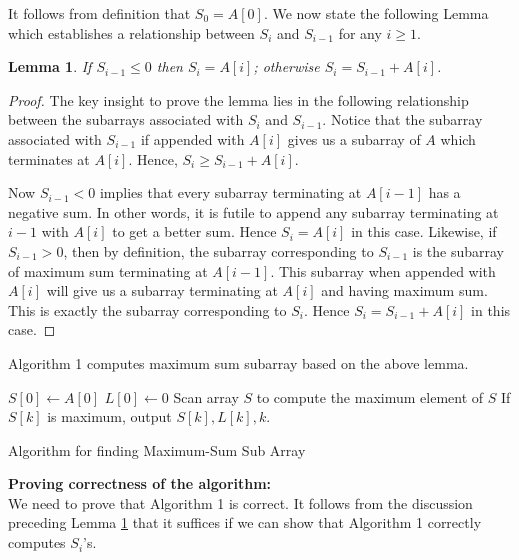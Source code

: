 \documentclass[11pt]{article}
\newtheorem{lemma}[theorem]{Lemma}
\begin{document}
It follows from definition that $S_0=A[0]$. We now state the following 
Lemma which establishes a relationship between $S_i$ and $S_{i-1}$ for any 
$i\ge 1$.
%
\begin{lemma}
If $S_{i-1}\leq 0 $ then $S_i=A[i]$; otherwise $S_i=S_{i-1}+A[i]$.
\label{Lemma:Si}
\end{lemma}
\vspace*{-.5cm}
\begin{proof}
The key insight to prove the lemma lies in the following relationship 
between the subarrays associated with $S_i$ and $S_{i-1}$.
Notice that the subarray associated with $S_{i-1}$ if appended with $A[i]$
gives us a subarray of $A$ which terminates at $A[i]$.
Hence, $S_i\ge S_{i-1}+A[i]$. 

Now $S_{i-1}<0$ implies that
every subarray terminating at $A[i-1]$ has a negative sum. In other words,
it is futile to append any subarray terminating at $i-1$ with $A[i]$ to
get a better sum. Hence $S_i=A[i]$ in this case.
Likewise, if $S_{i-1}>0$, then by definition, the subarray corresponding to 
$S_{i-1}$ is the subarray of maximum sum terminating at $A[i-1]$. This 
subarray when appended with $A[i]$ will give us a subarray terminating at
$A[i]$ and having maximum sum. This is exactly the subarray corresponding to 
$S_i$. Hence $S_i=S_{i-1}+A[i]$ in this case.
\end{proof}
%
Algorithm 1 computes maximum sum subarray based on the above lemma.
\IncMargin{1em}
\begin{algorithm}[h]
\SetAlgoLined
{}
$ S[0]\leftarrow A[0]$\;
$ L[0]\leftarrow 0 $\;
Scan array $S$ to compute the maximum element of $S$\;
If $S[k]$ is maximum, output $S[k], L[k], k$.  
\caption{Algorithm for finding Maximum-Sum Sub Array}
\end{algorithm}

%
\noindent
{\bf Proving correctness of the algorithm:}\\
We need to prove that Algorithm 1 is correct. It follows
from the discussion preceding Lemma \ref{Lemma:Si} that it suffices
if we can show that Algorithm 1 correctly computes $S_i$'s.
\end{document}
